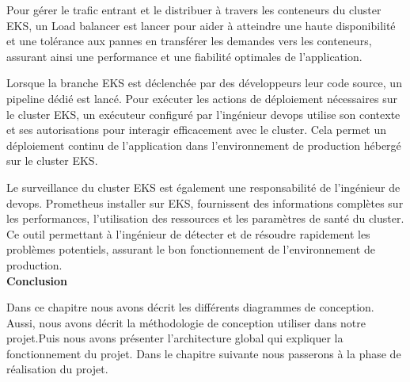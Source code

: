 Pour gérer le trafic entrant et le distribuer à travers les conteneurs du cluster EKS, un Load balancer est lancer pour aider à atteindre une haute disponibilité et une tolérance aux pannes en transférer les demandes vers les conteneurs, assurant ainsi une performance et une fiabilité optimales de l’application.
\\[0.01cm]
\indent
{}  
Lorsque la branche EKS est déclenchée par des développeurs  leur code source, un pipeline dédié est lancé. Pour exécuter les actions de déploiement nécessaires sur le cluster EKS, un exécuteur configuré par l’ingénieur devops utilise son contexte et ses autorisations pour interagir efficacement avec le cluster. Cela permet un déploiement continu de l’application dans l’environnement de production hébergé sur le cluster EKS.
\\[0.01cm]
\indent
{}  
Le surveillance du cluster EKS est également une responsabilité de l’ingénieur de devops. Prometheus installer sur EKS, fournissent des informations complètes sur les performances, l’utilisation des ressources et les paramètres de santé du cluster. Ce outil permettant à l’ingénieur de détecter et de résoudre rapidement les problèmes potentiels, assurant le bon fonctionnement de l’environnement de production.\\[0.3cm]

\textbf{\huge Conclusion}
  
  Dans ce chapitre nous avons décrit les différents diagrammes de conception. Aussi, nous avons décrit la méthodologie de conception utiliser dans notre projet.Puis nous avons présenter l'architecture global qui expliquer la fonctionnement du projet. Dans le chapitre suivante nous passerons à la phase de réalisation du projet.





